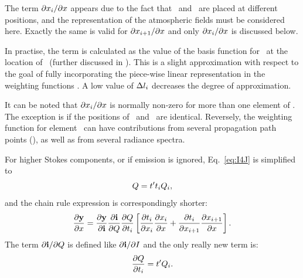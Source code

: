 The term $\partial x_{i}/\partial x$ appears due to the fact that
\ and \SttElm\ are placed at different positions, and the
representation of the atmospheric fields must be considered here. Exactly the
same is valid for $\partial x_{i+1}/\partial x$ and only
$\partial x_{i}/\partial x$ is discussed below.

In practise, the term is calculated as the value of the basis function for
\SttElm\ at the location of \ (further discussed in
\citet{buehler:artst:05}). This is a slight approximation with respect to the
goal of fully incorporating the piece-wise linear representation in the
weighting functions \citep{buehler:artst:05}. A low value of
$\Delta l_{i}$ decreases the degree of approximation.

It can be noted that $\partial x_{i} / \partial x$ is normally non-zero
for more than one element of \SttVct. The exception is if the positions of
\ and \SttElm\ are identical. Reversely, the weighting function for
element \SttElm\ can have contributions from several propagation path points
(), as well as from several radiance spectra. 

For higher Stokes components, or if emission is ignored, Eq.~\ref{eq:I4J} is
simplified to
\begin{equation}
  \label{eq:Q4J}
  Q = t't_{i}Q_{i},
\end{equation}
and the chain rule expression is correspondingly shorter:
\begin{equation}
  \frac{\partial\mathbf{y}}{\partial x} =  
  \frac{\partial\mathbf{y}}{\partial\mathbf{i}}
  \frac{\partial\mathbf{i}}{\partial Q} 
  \frac{\partial Q}{\partial t_{i}}
  \left[
    \frac{\partial t_{i}}{\partial x_{i}}
    \frac{\partial x_{i}}{\partial x} + 
    \frac{\partial t_{i}}{\partial x_{i+1}}  
    \frac{\partial x_{i+1}}{\partial x} 
  \right].
  \label{eq:chainrule1q}
\end{equation}
The term $\partial\mathbf{i}/\partial Q$ is defined like
$\partial\mathbf{i}/\partial I$ and the only really new term is:
\begin{equation}
  \frac{\partial Q}{\partial t_{i}} 
      = t'Q_{i}.
\end{equation}


